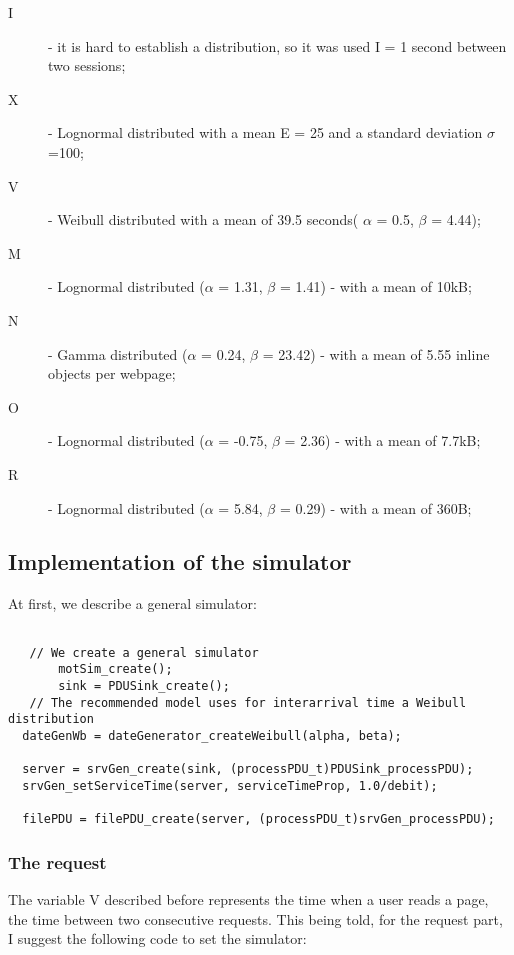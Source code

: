 \begin{description}
 \item[I] - it is hard to establish a distribution, so it was used I = 1 second between two sessions;
 \item[X] - Lognormal distributed with a mean E = 25 and a standard deviation $\sigma$=100;
 \item[V] - Weibull distributed with a mean of 39.5 seconds( $\alpha$ = 0.5, $\beta$ = 4.44);
 \item[M] - Lognormal distributed ($\alpha$ = 1.31, $\beta$ = 1.41) - with a mean of 10kB;
 \item[N] - Gamma distributed ($\alpha$ = 0.24, $\beta$ = 23.42) - with a mean of 5.55 inline objects per webpage;
 \item[O] - Lognormal distributed ($\alpha$ = -0.75, $\beta$ = 2.36) - with a mean of 7.7kB;
 \item[R] - Lognormal distributed ($\alpha$ = 5.84, $\beta$ = 0.29) - with a mean of 360B;
\end{description}

\subsection{Implementation of the simulator}
At first, we describe a general simulator:
\begin{verbatim}

   // We create a general simulator
       motSim_create();          
       sink = PDUSink_create();
   // The recommended model uses for interarrival time a Weibull distribution
  dateGenWb = dateGenerator_createWeibull(alpha, beta);
  
  server = srvGen_create(sink, (processPDU_t)PDUSink_processPDU);
  srvGen_setServiceTime(server, serviceTimeProp, 1.0/debit); 

  filePDU = filePDU_create(server, (processPDU_t)srvGen_processPDU); 

\end{verbatim}

\subsubsection{The request}

The variable V described before represents the time when a user reads a page, the time between two consecutive requests.
 This being told, for the request part, I suggest the following code to set the simulator:

